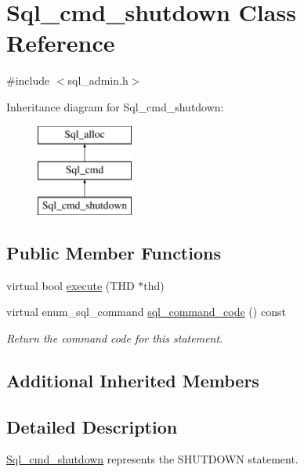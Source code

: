 \hypertarget{classSql__cmd__shutdown}{}\section{Sql\+\_\+cmd\+\_\+shutdown Class Reference}
\label{classSql__cmd__shutdown}


{\ttfamily \#include $<$sql\+\_\+admin.\+h$>$}

Inheritance diagram for Sql\+\_\+cmd\+\_\+shutdown\+:\begin{figure}[H]
\begin{center}
\leavevmode
\includegraphics[height=3.000000cm]{classSql__cmd__shutdown}
\end{center}
\end{figure}
\subsection*{Public Member Functions}
\begin{DoxyCompactItemize}
\item 
virtual bool \mbox{\hyperlink{classSql__cmd__shutdown_ae56998e3f20e85707c230561f32a56f3}{execute}} (T\+HD $\ast$thd)
\item 
\mbox{\label{classSql__cmd__shutdown_a6305321d893445e769e55261f0089fc8}} 
virtual enum\+\_\+sql\+\_\+command \mbox{\hyperlink{classSql__cmd__shutdown_a6305321d893445e769e55261f0089fc8}{sql\+\_\+command\+\_\+code}} () const
\begin{DoxyCompactList}\small\item\em Return the command code for this statement. \end{DoxyCompactList}\end{DoxyCompactItemize}
\subsection*{Additional Inherited Members}


\subsection{Detailed Description}
\mbox{\hyperlink{classSql__cmd__shutdown}{Sql\+\_\+cmd\+\_\+shutdown}} represents the S\+H\+U\+T\+D\+O\+WN statement. 

